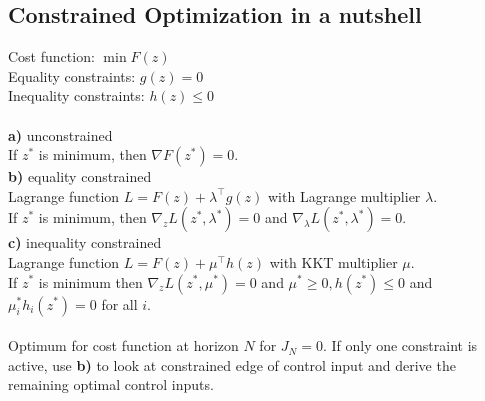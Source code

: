 \documentclass[english]{latex4ei/latex4ei_sheet}
\begin{document}
\begin{sectionbox}
\subsection{Constrained Optimization in a nutshell}
Cost function: $\min F(z)$\\
Equality constraints: $g(z)=0$\\
Inequality constraints: $h(z)\leq 0$\\
\\
\textbf{a)} unconstrained\\
If $z^*$ is minimum, then $\nabla F(z^*)=0$.\\
\textbf{b)} equality constrained\\
Lagrange function $L=F(z)+\lambda^{\top} g(z)$ with Lagrange multiplier $\lambda$. \\ 
If $z^{*}$ is minimum, then $\nabla_{z} L\left(z^{*}, \lambda^{*}\right)=0$ and $\nabla_{\lambda} L\left(z^{*}, \lambda^{*}\right)=0$. \\
\textbf{c)} inequality constrained\\
Lagrange function $L=F(z)+\mu^{\top} h(z)$ with KKT multiplier $\mu$. \\
If $z^{*}$ is minimum then $\nabla_{z} L\left(z^{*}, \mu^{*}\right)=0$ and $\mu^{*} \geq 0, h\left(z^{*}\right) \leq 0$ and $\mu_{i}^{*} h_{i}\left(z^{*}\right)=0$ for all $i$.\\
\\
Optimum for cost function at horizon $N$ for $J_N=0$. If only one constraint is active, use \textbf{b)} to look at constrained edge of control input and derive the remaining optimal control inputs.

\end{sectionbox}
\end{document}
